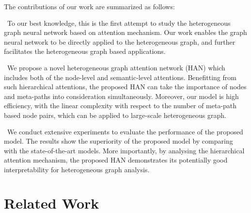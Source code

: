 The contributions of our work are summarized as follows:

\textbullet\  To our best knowledge, this is the first attempt to study the heterogeneous graph neural network based on attention mechanism. Our work enables the graph neural network to be directly applied to the heterogeneous graph, and further facilitates the heterogeneous graph based applications.


\textbullet\   We propose a novel heterogeneous graph attention network (HAN) which includes both of the node-level and semantic-level attentions.
	Benefitting from such hierarchical attentions, the proposed HAN can take the importance of nodes and meta-paths into consideration simultaneously. Moreover, our model is high efficiency, with the linear complexity with respect to the number of meta-path based node pairs, which can be applied to large-scale heterogeneous graph.
	
\textbullet\  	We conduct extensive experiments to evaluate the performance of the proposed model. 
	The results show the superiority of the proposed model by comparing with the state-of-the-art models.
More importantly, by analysing 
	the hierarchical attention mechanism, the proposed HAN
	demonstrates its potentially good interpretability for heterogeneous graph analysis.











\section{Related Work}

